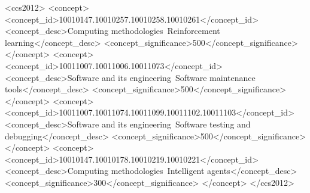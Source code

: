 \documentclass[sigconf]{acmart}
\begin{document}


\begin{CCSXML}
<ccs2012>
   <concept>
       <concept_id>10010147.10010257.10010258.10010261</concept_id>
       <concept_desc>Computing methodologies~Reinforcement learning</concept_desc>
       <concept_significance>500</concept_significance>
       </concept>
   <concept>
       <concept_id>10011007.10011006.10011073</concept_id>
       <concept_desc>Software and its engineering~Software maintenance tools</concept_desc>
       <concept_significance>500</concept_significance>
       </concept>
   <concept>
       <concept_id>10011007.10011074.10011099.10011102.10011103</concept_id>
       <concept_desc>Software and its engineering~Software testing and debugging</concept_desc>
       <concept_significance>500</concept_significance>
       </concept>
   <concept>
       <concept_id>10010147.10010178.10010219.10010221</concept_id>
       <concept_desc>Computing methodologies~Intelligent agents</concept_desc>
       <concept_significance>300</concept_significance>
       </concept>
 </ccs2012>
\end{CCSXML}


\end{document}
